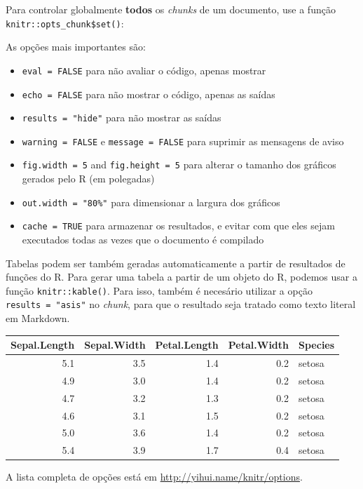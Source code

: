\documentclass[10pt,a4paper]{book}
\providecommand{\tightlist}{%
  \setlength{\itemsep}{0pt}\setlength{\parskip}{0pt}}
\begin{document}
Para controlar globalmente \textbf{todos} os \emph{chunks} de um
documento, use a função \texttt{knitr::opts\_chunk\$set()}:

As opções mais importantes são:

\begin{itemize}
\tightlist
\item
  \texttt{eval\ =\ FALSE} para não avaliar o código, apenas mostrar
\item
  \texttt{echo\ =\ FALSE} para não mostrar o código, apenas as saídas
\item
  \texttt{results\ =\ "hide"} para não mostrar as saídas
\item
  \texttt{warning\ =\ FALSE} e \texttt{message\ =\ FALSE} para suprimir
  as mensagens de aviso
\item
  \texttt{fig.width\ =\ 5} and \texttt{fig.height\ =\ 5} para alterar o
  tamanho dos gráficos gerados pelo R (em polegadas)
\item
  \texttt{out.width\ =\ "80\%"} para dimensionar a largura dos gráficos
\item
  \texttt{cache\ =\ TRUE} para armazenar os resultados, e evitar com que
  eles sejam executados todas as vezes que o documento é compilado
\end{itemize}

Tabelas podem ser também geradas automaticamente a partir de resultados
de funções do R. Para gerar uma tabela a partir de um objeto do R,
podemos usar a função \texttt{knitr::kable()}. Para isso, também é
necesário utilizar a opção \texttt{results\ =\ "asis"} no \emph{chunk},
para que o resultado seja tratado como texto literal em Markdown.

\begin{tabular}{r|r|r|r|l}
\hline
Sepal.Length & Sepal.Width & Petal.Length & Petal.Width & Species\\
\hline
5.1 & 3.5 & 1.4 & 0.2 & setosa\\
\hline
4.9 & 3.0 & 1.4 & 0.2 & setosa\\
\hline
4.7 & 3.2 & 1.3 & 0.2 & setosa\\
\hline
4.6 & 3.1 & 1.5 & 0.2 & setosa\\
\hline
5.0 & 3.6 & 1.4 & 0.2 & setosa\\
\hline
5.4 & 3.9 & 1.7 & 0.4 & setosa\\
\hline
\end{tabular}

A lista completa de opções está em
\url{http://yihui.name/knitr/options}.
\end{document}
